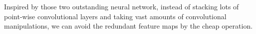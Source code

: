 {



Inspired by those two outstanding neural network\cite{19}\cite{20}, instead of stacking lots of point-wise convolutional layers and taking vast amounts of convolutional manipulations, we can avoid the redundant feature maps by the cheap operation. 

}
